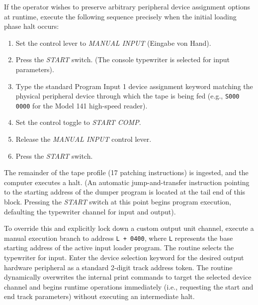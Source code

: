 \begin{enumerate}
    If the operator wishes to preserve arbitrary peripheral device assignment options at runtime, execute the following sequence precisely when the initial loading phase halt occurs:
    \begin{enumerate}
        \item Set the control lever to \textit{MANUAL INPUT} (Eingabe von Hand).
        \item Press the \textit{START} switch. (The console typewriter is selected for input parameters).
        \item Type the standard Program Input 1 device assignment keyword matching the physical peripheral device through which the tape is being fed (e.g., \texttt{S000 0000} for the Model 141 high-speed reader).
        \item Set the control toggle to \textit{START COMP}.
        \item Release the \textit{MANUAL INPUT} control lever.
        \item Press the \textit{START} switch.
    \end{enumerate}
    The remainder of the tape profile (17 patching instructions) is ingested, and the computer executes a halt. (An automatic jump-and-transfer instruction pointing to the starting address of the dumper program is located at the tail end of this block. Pressing the \textit{START} switch at this point begins program execution, defaulting the typewriter channel for input and output). 
    
    To override this and explicitly lock down a custom output unit channel, execute a manual execution branch to address \texttt{L + 0400}, where \texttt{L} represents the base starting address of the active input loader program. The routine selects the typewriter for input. Enter the device selection keyword for the desired output hardware peripheral as a standard 2-digit track address token. The routine dynamically overwrites the internal print commands to target the selected device channel and begins runtime operations immediately (i.e., requesting the start and end track parameters) without executing an intermediate halt.


\end{enumerate}

